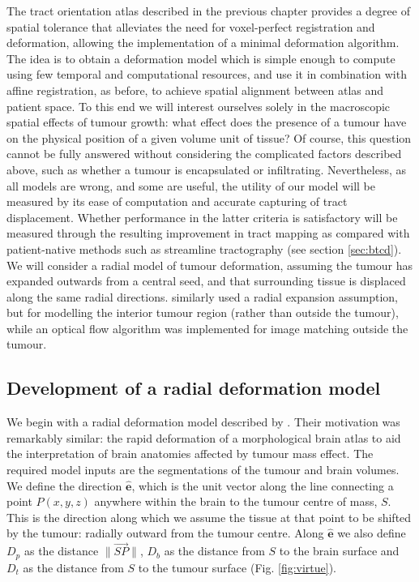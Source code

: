 The tract orientation atlas described in the previous chapter provides a degree of spatial tolerance that alleviates the need for voxel-perfect registration and deformation, allowing the implementation of a minimal deformation algorithm.
The idea is to obtain a deformation model which is simple enough to compute using few temporal and computational resources, and use it in combination with affine registration, as before, to achieve spatial alignment between atlas and patient space.
To this end we will interest ourselves solely in the macroscopic spatial effects of tumour growth: what effect does the presence of a tumour have on the physical position of a given volume unit of tissue? 
Of course, this question cannot be fully answered without considering the complicated factors described above, such as whether a tumour is encapsulated or infiltrating.
Nevertheless, as all models are wrong, and some are useful, the utility of our model will be measured by its ease of computation and accurate capturing of tract displacement.
Whether performance in the latter criteria is satisfactory will be measured through the resulting improvement in tract mapping as compared with patient-native methods such as streamline tractography (see section \ref{sec:btcd}).
We will consider a radial model of tumour deformation, assuming the tumour has expanded outwards from a central seed, and that surrounding tissue is displaced along the same radial directions.
\textcite{Cuadra2004} similarly used a radial expansion assumption, but for modelling the interior tumour region (rather than outside the tumour), while an optical flow algorithm was implemented for image matching outside the tumour.


\subsection{Development of a radial deformation model}

We begin with a radial deformation model described by \textcite{Nowinski2005}.
Their motivation was remarkably similar: the rapid deformation of a morphological brain atlas to aid the interpretation of brain anatomies affected by tumour mass effect.
The required model inputs are the segmentations of the tumour and brain volumes.
We define the direction $\mathbf{\hat{e}}$, which is the unit vector along the line connecting a point $P(x,y,z)$ anywhere within the brain to the tumour centre of mass, $S$.
This is the direction along which we assume the tissue at that point to be shifted by the tumour: radially outward from the tumour centre.
Along $\mathbf{\hat{e}}$ we also define $D_p$ as the distance  $\|\overrightarrow{SP}\|$, $D_b$ as the distance from $S$ to the brain surface and $D_t$ as the distance from $S$ to the tumour surface (Fig. \ref{fig:virtue}).

